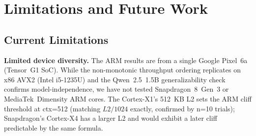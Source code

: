 \documentclass[conference]{IEEEtran}
\begin{document}
\begin{table}[h]
\centering
\caption{Qwen~2.5~1.5B filled-context decode TPS (mean$\pm$SEM, $n{=}5$/cell).
  \textbf{Bold} = $>$10\% decline from ctx=256 baseline.
  L2-predicted cliff: ctx=512 (Cortex-X1, 512~KB L2; confirmed).}
\label{tab:qwen_ctx2048}
\end{table}

\section{Limitations and Future Work}
\label{sec:limitations}
\label{sec:future}

\subsection{Current Limitations}

\textbf{Limited device diversity.} The ARM results are from a single Google Pixel~6a
(Tensor~G1 SoC). While the non-monotonic throughput ordering replicates on x86 AVX2
(Intel i5-1235U) and the Qwen~2.5~1.5B generalizability check confirms model-independence,
we have not tested Snapdragon~8~Gen~3 or MediaTek~Dimensity ARM cores.
The Cortex-X1's 512~KB L2 sets the ARM cliff threshold at ctx=512 (matching $L2/1024$ exactly,
confirmed by n=10 trials); Snapdragon's Cortex-X4 has a larger L2 and would exhibit a later cliff
predictable by the same formula.
\end{document}

